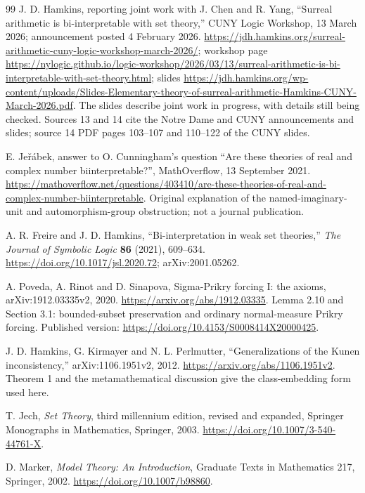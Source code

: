 \documentclass[11pt,letterpaper]{article}
\theoremstyle{definition}
\theoremstyle{remark}
\begin{document}
\begin{thebibliography}{99}
J. D. Hamkins, reporting joint work with J. Chen and R. Yang, ``Surreal
arithmetic is bi-interpretable with set theory,'' CUNY Logic Workshop,
13 March 2026; announcement posted 4 February 2026.
\url{https://jdh.hamkins.org/surreal-arithmetic-cuny-logic-workshop-march-2026/};
workshop page
\url{https://nylogic.github.io/logic-workshop/2026/03/13/surreal-arithmetic-is-bi-interpretable-with-set-theory.html};
slides
\url{https://jdh.hamkins.org/wp-content/uploads/Slides-Elementary-theory-of-surreal-arithmetic-Hamkins-CUNY-March-2026.pdf}.
The slides describe joint work in progress, with details still being checked.
Sources 13 and 14 cite the Notre Dame and CUNY announcements and slides; source 14
PDF pages 103--107 and 110--122 of the CUNY slides.

E. Je\v{r}\'abek, answer to O. Cunningham's question ``Are these theories of
real and complex number biinterpretable?'', MathOverflow, 13 September 2021.
\url{https://mathoverflow.net/questions/403410/are-these-theories-of-real-and-complex-number-biinterpretable}.
Original explanation of the named-imaginary-unit and automorphism-group
obstruction; not a journal publication.

A. R. Freire and J. D. Hamkins, ``Bi-interpretation in weak set theories,''
\emph{The Journal of Symbolic Logic} \textbf{86} (2021), 609--634.
\url{https://doi.org/10.1017/jsl.2020.72}; arXiv:2001.05262.

A. Poveda, A. Rinot and D. Sinapova, Sigma-Prikry forcing I: the axioms,
arXiv:1912.03335v2, 2020. \url{https://arxiv.org/abs/1912.03335}.
Lemma 2.10 and Section 3.1: bounded-subset preservation and ordinary
normal-measure Prikry forcing. Published version:
\url{https://doi.org/10.4153/S0008414X20000425}.

J. D. Hamkins, G. Kirmayer and N. L. Perlmutter, ``Generalizations of the Kunen
inconsistency,'' arXiv:1106.1951v2, 2012. \url{https://arxiv.org/abs/1106.1951v2}.
Theorem 1 and the metamathematical discussion give the class-embedding form
used here.

T. Jech, \emph{Set Theory}, third millennium edition, revised and expanded,
Springer Monographs in Mathematics, Springer, 2003.
\url{https://doi.org/10.1007/3-540-44761-X}.

D. Marker, \emph{Model Theory: An Introduction}, Graduate Texts in Mathematics
217, Springer, 2002. \url{https://doi.org/10.1007/b98860}.


\end{thebibliography}
\end{document}
